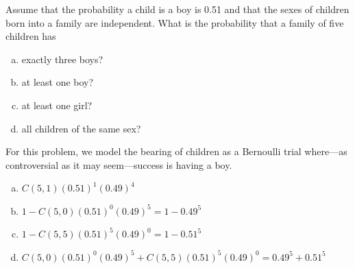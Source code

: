 \documentclass[../main.tex]{subfiles}
\begin{document}
Assume that the probability a child is a boy is 0.51 and that the sexes of children born into a family are independent.
What is the probability that a family of five children has
\begin{enumerate}[a)]
	\item exactly three boys?
	\item at least one boy?
	\item at least one girl?
	\item all children of the same sex?
\end{enumerate}

\solution
For this problem, we model the bearing of children as a Bernoulli trial where---as controversial as it may seem---success is having a boy.
\begin{enumerate}[a)]
	\item $C(5, 1)(0.51)^1(0.49)^4$
	\item $1 - C(5, 0)(0.51)^0(0.49)^5 = 1 - 0.49^5$
	\item $1 - C(5, 5)(0.51)^5(0.49)^0 = 1 - 0.51^5$
	\item $C(5, 0)(0.51)^0(0.49)^5 + C(5, 5)(0.51)^5(0.49)^0 = 0.49^5 + 0.51^5$
\end{enumerate}
\end{document}
